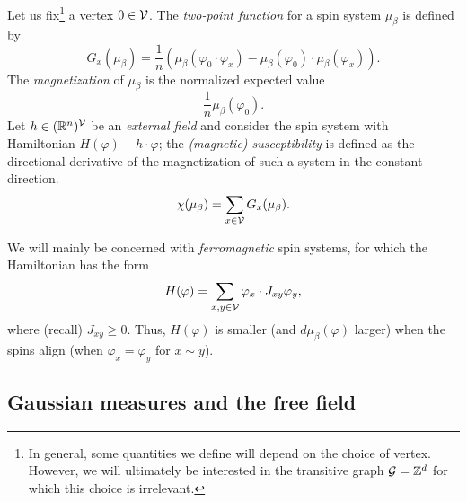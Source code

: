 Let us fix\footnote{In general, some quantities we define will depend on the choice of vertex. However, we will ultimately be interested in the transitive graph $\mathcal{G} = { {{\mathbb Z}}^d }$ for which this choice is irrelevant.} a vertex
$0 \in \mathcal{V}$. The \emph{two-point function} for a spin system $\mu_\beta$ is defined by
\begin{equation}
G_x(\mu_\beta)
  =
\frac{1}{n}
(\mu_\beta(\varphi_0 \cdot \varphi_x)
  -
\mu_\beta(\varphi_0) \cdot \mu_\beta(\varphi_x)).
\end{equation}
The \emph{magnetization} of $\mu_\beta$ is the normalized expected value
\begin{equation}
\frac{1}{n} \mu_\beta(\varphi_0).
\end{equation}
Let $h \in ({\mathbb R}^n)^{\mathcal{V}}$ be an \emph{external field} and consider the spin system with Hamiltonian $H(\varphi) + h \cdot \varphi$;
the \emph{(magnetic) susceptibility} is defined as the directional derivative of the magnetization of such a system in the constant direction. 
\begin{equation}
\chi(\mu_\beta) = \sum_{x\in\mathcal{V}} G_x(\mu_\beta).
\end{equation}

We will mainly be concerned with \emph{ferromagnetic} spin systems, for which the Hamiltonian has the form
\begin{equation}
H(\varphi) = \sum_{x, y \in \mathcal{V}} \varphi_x \cdot J_{xy} \varphi_y,
\end{equation}
where (recall) $J_{xy} \ge 0$. Thus, $H(\varphi)$ is smaller (and $d\mu_\beta(\varphi)$ larger) when the spins align (when $\varphi_x = \varphi_y$ for $x \sim y$).


\subsection{Gaussian measures and the free field}

